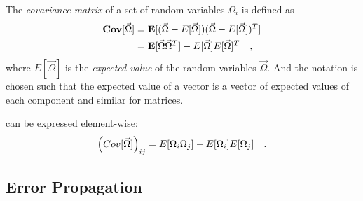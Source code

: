 The \emph{covariance matrix} of a set of random variables $\Omega_i$ is defined as
%
\begin{align}
    \mathbf{Cov}[\vec{\Omega}] &= \mathbf{E}[(\vec{\Omega} - E[\vec{\Omega}])(\vec{\Omega} - E[\vec{\Omega}])^T]
    \notag \\
    &= \mathbf{E}[\vec{\Omega}\vec{\Omega}^T] - E[\vec{\Omega}]E[\vec{\Omega}]^T
    \quad ,
    \label{eq_def_cov}
\end{align}
%
where $E[\vec{\Omega}]$ is the \emph{expected value} of the random variables $\vec{\Omega}$. And the
notation is chosen such that the expected value of a vector is a vector
of expected values of each component and similar for matrices.

 can be expressed element-wise:
%
\begin{equation}
    \left(Cov[\vec{\Omega}]\right)_{ij} = E[\Omega_i\Omega_j] - E[\Omega_i]E[\Omega_j]
    \quad .
\end{equation}
%
\subsection{Error Propagation}

